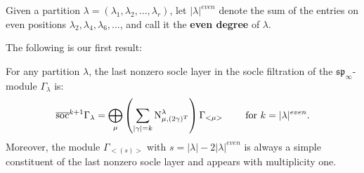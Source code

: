 \documentclass[main.tex]{subfiles}
\begin{document}
\begin{defn}
    Given a partition $\lambda = (\lambda_1,\lambda_2, ..., \lambda_r)$, let $|\lambda|^{even}$ denote the sum of the entries on even positions $\lambda_2, \lambda_4, \lambda_6, ...$, and call it the \textbf{even degree} of $\lambda$. 
\end{defn}

\bigskip
The following is our first result:
\begin{prop}
    \label{socle-filtr-height}
    For any partition $\lambda$, the last nonzero socle layer in the socle filtration of the $\mathfrak{sp}_\infty$-module $\Gamma_\lambda$ is:
    $$
    \overline{\text{soc}}^{k+1}\Gamma_\lambda = \bigoplus\limits_{\mu} \left( \sum\limits_{|\gamma|=k} \text{N}^{\lambda}_{\mu, (2\gamma)^T} \right) \Gamma_{<\mu>}
    \hspace{0.7cm} \text{ for } k = |\lambda|^{even}.
    $$
    Moreover, the module $\Gamma_{<(s)>}$ with $s = |\lambda| - 2|\lambda|^{even}$ is always a simple constituent of the last nonzero socle layer and appears with multiplicity one.
\end{prop}
\end{document}
